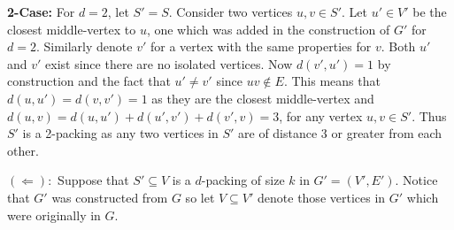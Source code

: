 \documentclass[10pt, a4paper]{article}
\theoremstyle{definition}
\begin{document}
\textbf{2-Case:} For $d = 2$, let $S' = S$. Consider two vertices $u,v \in S'$. Let $u' \in V'$ be the closest middle-vertex to $u$, one which was added in the construction of $G'$ for $d=2$. Similarly denote $v'$ for a vertex with the same properties for $v$. Both $u'$ and $v'$ exist since there are no isolated vertices. Now $d(v',u') = 1$ by construction and the fact that $u' \neq v'$ since $uv \notin E$. This means that $d(u,u') = d(v,v') = 1$ as they are the closest middle-vertex and $d(u,v) = d(u,u') + d(u',v') + d(v',v) = 3$, for any vertex $u,v \in S'$. Thus $S'$ is a 2-packing as any two vertices in $S'$ are of distance 3 or greater from each other.



$(\Leftarrow):$ Suppose that $S' \subseteq V$ is a $d$-packing of size $k$ in $G' = (V', E')$. Notice that $G'$ was constructed from $G$ so let $V \subseteq V'$ denote those vertices in $G'$ which were originally in $G$.
\end{document}
